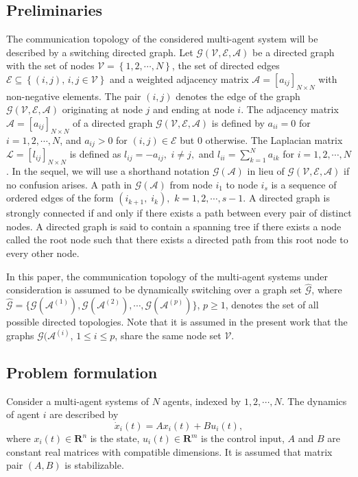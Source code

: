 \documentclass[letterpaper, 10 pt, conference]{ieeeconf}
\begin{document}
\subsection{Preliminaries}
The communication topology of the considered multi-agent system will be
described by a switching directed graph.
Let $\mathcal{G}(\mathcal{V},\mathcal{E},\mathcal {A})$ be a directed graph with the set of nodes $\mathcal{V} = \left\{ {1,2, \cdots ,N} \right\}$, the set of
directed edges $\mathcal{E}\subseteq \left\{(i,j),\,i,j\in
  \mathcal{V}\right\}$  and a weighted adjacency matrix
$\mathcal{A}=[a_{ij}]_{N\times N}$ with non-negative elements. The pair
$(i,j)$ denotes the edge
of the graph $\mathcal{G}(\mathcal{V},\mathcal{E},\mathcal {A})$
originating at node $j$ and ending at node $i$.
The adjacency matrix $\mathcal{A} = [{a_{ij}}]_{N \times N}$  of a directed
graph $\mathcal{G}(\mathcal{V},\mathcal{E},\mathcal {A})$ is defined by
${a_{ii}} = 0$  for $i = 1,2, \cdots ,N$,  and ${a_{ij}}> 0$ for $(i,j) \in
\mathcal{E}$ but $0$ otherwise. The Laplacian matrix $\mathcal{L} =
[{l_{ij}}]_{N \times N}$ is defined as ${l_{ij}} = -a_{ij},$ $i \ne j,$
and  $l_{ii}=\sum\nolimits_{k = 1}^N {{a_{ik}}} $  for  $i = 1,2, \cdots
,N$. In the sequel, we will
use a shorthand notation $\mathcal{G}(\mathcal{A})$ in lieu of
$\mathcal{G}(\mathcal{V},\mathcal{E},\mathcal {A})$ if no confusion
arises.  A path in
$\mathcal{G}(\mathcal{A})$ from node ${i_1}$ to node ${i_s}$ is a sequence
of ordered edges of the form $({i_{k+1}},\;{i_k}),$ $k = 1,2, \cdots ,s-1$.
A directed graph is strongly connected if and only if there exists a path
between every pair of distinct nodes.  A directed
graph is said to contain a spanning tree if there
exists a node called the root node such
that there exists a
directed path from this root node to every
other node.

\par
In this paper, the communication topology of
the multi-agent systems under
consideration is assumed to be dynamically
 switching over a graph set $\widehat{\mathcal{G}}$, where $\widehat{\mathcal{G}}=\{\mathcal{G}(\mathcal{A}^{(1)}),\mathcal{G}(\mathcal{A}^{(2)}),
 \cdots,\mathcal{G}(\mathcal{A}^{(p)})\}$, $p\geq 1$, denotes the set of
 all possible directed topologies. Note that it is assumed in the present
 work that the graphs $\mathcal{G}(\mathcal{A}^{(i)}$, $1\leq i \leq p$, share
 the same node set $\mathcal{V}$.


\subsection{Problem formulation}
Consider a multi-agent systems of $N$ agents, indexed by $1, 2, \cdots, N$. The dynamics
of agent $i$ are described by
\begin{equation}\label{Mode}
\dot{x}_i(t) = A{x_i}(t) + B{u_i}(t),
\end{equation}
where $x_{i}(t)\in \mathbf{R}^{n}$ is the state, ${u_i}(t) \in {\mathbf{R}^m}$ is the control input,
 $A$ and $B$ are constant real matrices with compatible dimensions. It is assumed that matrix pair $(A,B)$
is stabilizable.
\end{document}
